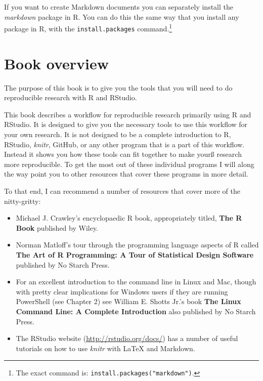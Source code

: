 If you want to create Markdown documents you can separately install the {\emph{markdown}} package in R. You can do this the same way that you install any package in R, with the {\tt{install.packages}} command.\footnote{The exact command is: {\tt{install.packages("markdown")}}.} 


\section{Book overview}

The purpose of this book is to give you the tools that you will need to do reproducible research with R and RStudio. 

This book describes a workflow for reproducible research primarily using R and RStudio. It is designed to give you the necessary tools to use this workflow for your own research. It is not designed to be a complete introduction to R, RStudio, {\emph{knitr}}, GitHub, or any other program that is a part of this workflow. Instead it shows you how these tools can fit together to make yourß research more reproducible. To get the most out of these individual programs I will along the way point you to other resources that cover these programs in more detail.

To that end, I can recommend a number of resources that cover more of the nitty-gritty:

\begin{itemize}
    \item Michael J. Crawley's encyclopaedic R book, appropriately titled, \textbf{The R Book} published by Wiley.
    
    \item Norman Matloff's tour through the programming language aspects of  R called \textbf{The Art of R Programming: A Tour of Statistical Design Software} published by No Starch Press.
    
    \item For an excellent introduction to the command line in Linux and Mac, though with pretty clear implications for Windows users if they are running PowerShell (see Chapter 2) see William E. Shotts Jr.'s book \textbf{The Linux Command Line: A Complete Introduction} also published by No Starch Press.
    
    \item The RStudio website (\url{http://rstudio.org/docs/}) has a
  number of useful tutorials on how to use {\emph{knitr}} with LaTeX and Markdown.
\end{itemize}

